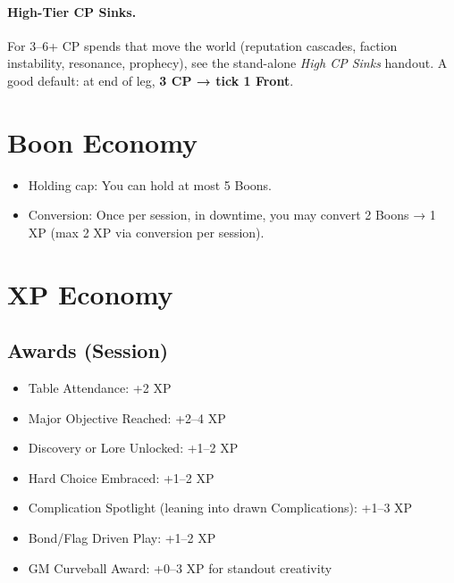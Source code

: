 \paragraph{High-Tier CP Sinks.}
For 3–6+ CP spends that move the world (reputation cascades, faction instability, resonance, prophecy), see the stand-alone \emph{High CP Sinks} handout. A good default: at end of leg, \textbf{3 CP → tick 1 Front}.

\section{Boon Economy}

\begin{itemize}
    \item Holding cap: You can hold at most 5 Boons.
    \item Conversion: Once per session, in downtime, you may convert 2 Boons → 1 XP (max 2 XP via conversion per session).
\end{itemize}

\section{XP Economy}

\subsection{Awards (Session)}

\begin{itemize}
\item Table Attendance: +2 XP
\item Major Objective Reached: +2--4 XP
\item Discovery or Lore Unlocked: +1--2 XP
\item Hard Choice Embraced: +1--2 XP
\item Complication Spotlight (leaning into drawn Complications): +1--3 XP
\item Bond/Flag Driven Play: +1--2 XP
\item GM Curveball Award: +0--3 XP for standout creativity
\end{itemize}

